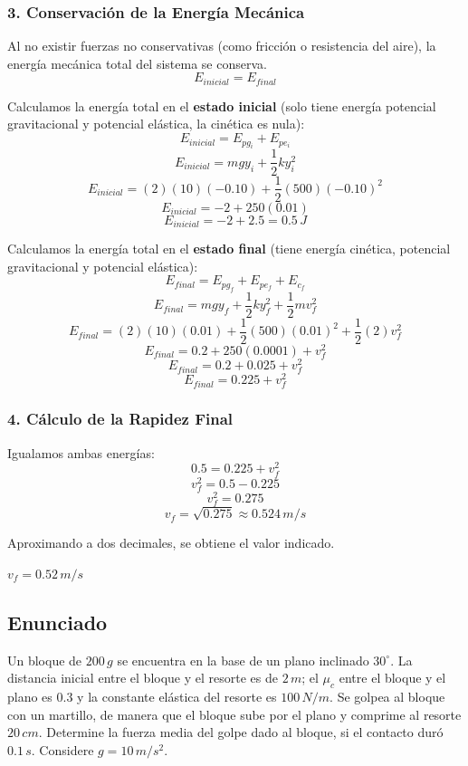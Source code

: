 \documentclass[12pt, a4paper]{article}
\begin{document}
\subsubsection*{3. Conservación de la Energía Mecánica}
Al no existir fuerzas no conservativas (como fricción o resistencia del aire), la energía mecánica total del sistema se conserva.
$$ E_{inicial} = E_{final} $$

Calculamos la energía total en el \textbf{estado inicial} (solo tiene energía potencial gravitacional y potencial elástica, la cinética es nula):
$$ E_{inicial} = E_{pg_i} + E_{pe_i} $$
$$ E_{inicial} = mg y_i + \frac{1}{2} k y_i^2 $$
$$ E_{inicial} = (2)(10)(-0.10) + \frac{1}{2} (500) (-0.10)^2 $$
$$ E_{inicial} = -2 + 250 (0.01) $$
$$ E_{inicial} = -2 + 2.5 = 0.5 \, \si{J} $$

Calculamos la energía total en el \textbf{estado final} (tiene energía cinética, potencial gravitacional y potencial elástica):
$$ E_{final} = E_{pg_f} + E_{pe_f} + E_{c_f} $$
$$ E_{final} = mg y_f + \frac{1}{2} k y_f^2 + \frac{1}{2} m v_f^2 $$
$$ E_{final} = (2)(10)(0.01) + \frac{1}{2} (500) (0.01)^2 + \frac{1}{2} (2) v_f^2 $$
$$ E_{final} = 0.2 + 250 (0.0001) + v_f^2 $$
$$ E_{final} = 0.2 + 0.025 + v_f^2 $$
$$ E_{final} = 0.225 + v_f^2 $$

\subsubsection*{4. Cálculo de la Rapidez Final}
Igualamos ambas energías:
$$ 0.5 = 0.225 + v_f^2 $$
$$ v_f^2 = 0.5 - 0.225 $$
$$ v_f^2 = 0.275 $$
$$ v_f = \sqrt{0.275} \approx 0.524 \, \si{m/s} $$

Aproximando a dos decimales, se obtiene el valor indicado.

\begin{tcolorbox}[colback=green!5!white, colframe=green!50!black, title=Respuesta Final]
\centering \Large $v_f = 0.52 \, \si{m/s}$
\end{tcolorbox}

\newpage

\subsection*{Enunciado}
Un bloque de $200 \, \si{g}$ se encuentra en la base de un plano inclinado $30^\circ$. La distancia inicial entre el bloque y el resorte es de $2 \, \si{m}$; el $\mu_c$ entre el bloque y el plano es $0.3$ y la constante elástica del resorte es $100 \, \si{N/m}$. Se golpea al bloque con un martillo, de manera que el bloque sube por el plano y comprime al resorte $20 \, \si{cm}$. Determine la fuerza media del golpe dado al bloque, si el contacto duró $0.1 \, \si{s}$. Considere $g = 10 \, \si{m/s^2}$.
\end{document}
